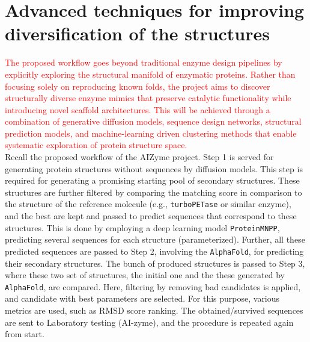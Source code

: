\documentclass[runningheads]{llncs}
\begin{document}
	
	  
 \section{Advanced techniques for improving diversification of the structures }
 
 \textcolor{red}{
 	The proposed workflow goes beyond traditional enzyme design pipelines by explicitly exploring the structural manifold of enzymatic proteins. Rather than focusing solely on reproducing known folds, the project aims to discover structurally diverse enzyme mimics that preserve catalytic functionality while introducing novel scaffold architectures. This will be achieved through a combination of generative diffusion models, sequence design networks, structural prediction models, and machine-learning driven clustering methods that enable systematic exploration of protein structure space. }\\
 	
	Recall the proposed workflow of the AIZyme project.
	Step 1 is served for generating protein structures without sequences by diffusion models. This step is required for generating a promising starting pool of secondary structures.  %
	These structures are further filtered by comparing the matching score in comparison to the structure of the reference molecule (e.g., \texttt{turboPETase} or similar enzyme), and the best are kept and passed to predict sequences that correspond to these structures. This is done by employing a deep learning model \texttt{ProteinMNPP}, predicting several sequences for each structure (parameterized).  Further, all these predicted sequences are passed to Step 2, involving the \texttt{AlphaFold}, for predicting their secondary structures. The bunch of produced structures is passed to Step 3, where these two set of structures, the initial one and the these generated by \texttt{AlphaFold},  are compared. Here,  filtering by removing bad candidates is applied, and candidate with best parameters are selected. For this purpose, various metrics are used, such as RMSD score ranking.  The obtained/survived sequences are sent to Laboratory testing (AI-zyme), and the procedure is repeated again from start. 
	
\end{document}
